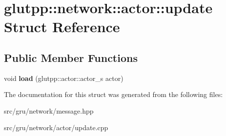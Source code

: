 \hypertarget{structglutpp_1_1network_1_1actor_1_1update}{\section{glutpp\-:\-:network\-:\-:actor\-:\-:update \-Struct \-Reference}
\label{structglutpp_1_1network_1_1actor_1_1update}
}
\subsection*{\-Public \-Member \-Functions}
\begin{DoxyCompactItemize}
\item 
\hypertarget{structglutpp_1_1network_1_1actor_1_1update_ab5848c7c049ecd9b864a38db22aacfe6}{void {\bfseries load} (glutpp\-::actor\-::actor\-\_\-s actor)}\label{structglutpp_1_1network_1_1actor_1_1update_ab5848c7c049ecd9b864a38db22aacfe6}

\end{DoxyCompactItemize}


\-The documentation for this struct was generated from the following files\-:\begin{DoxyCompactItemize}
\item 
src/gru/network/message.\-hpp\item 
src/gru/network/actor/update.\-cpp\end{DoxyCompactItemize}
